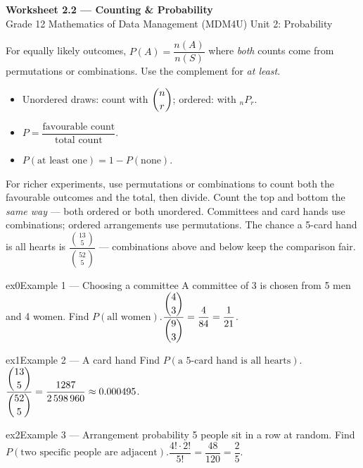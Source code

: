 \documentclass[11pt]{article}
\begin{document}
\begin{center}
{\LARGE\bfseries\color{titleblue}Worksheet 2.2 --- Counting \& Probability}\\[2pt]
{\small Grade 12 Mathematics of Data Management (MDM4U) \textperiodcentered{} Unit 2: Probability}
\end{center}

\begin{ideabox}
For equally likely outcomes, $P(A)=\dfrac{n(A)}{n(S)}$ where \emph{both} counts come from permutations or combinations. Use the complement for \emph{at least}.
\begin{itemize}[leftmargin=*,itemsep=2pt]
  \item Unordered draws: count with $\dbinom{n}{r}$; ordered: with $_nP_r$.
  \item $P=\dfrac{\text{favourable count}}{\text{total count}}$.
  \item $P(\text{at least one})=1-P(\text{none})$.
\end{itemize}
\end{ideabox}

\begin{learnbox}
For richer experiments, use permutations or combinations to count both the favourable outcomes and the total, then divide.
Count the top and bottom the \emph{same way} — both ordered or both unordered. Committees and card hands use combinations; ordered arrangements use permutations.
The chance a 5-card hand is all hearts is $\dfrac{\binom{13}{5}}{\binom{52}{5}}$ — combinations above and below keep the comparison fair.
\end{learnbox}


\begin{example}{ex0}{Example 1 --- Choosing a committee}
A committee of 3 is chosen from 5 men and 4 women. Find $P(\text{all women})$.\soln $\dfrac{\dbinom{4}{3}}{\dbinom{9}{3}}=\dfrac{4}{84}=\dfrac{1}{21}$.
\end{example}

\begin{example}{ex1}{Example 2 --- A card hand}
Find $P(\text{a 5-card hand is all hearts})$.\soln $\dfrac{\dbinom{13}{5}}{\dbinom{52}{5}}=\dfrac{1287}{2\,598\,960}\approx0.000495$.
\end{example}

\begin{example}{ex2}{Example 3 --- Arrangement probability}
5 people sit in a row at random. Find $P(\text{two specific people are adjacent})$.\soln $\dfrac{4!\cdot2!}{5!}=\dfrac{48}{120}=\dfrac25$.
\end{example}
\end{document}
